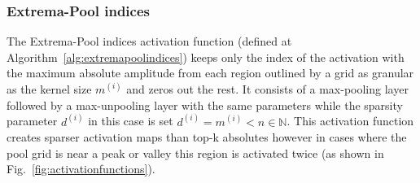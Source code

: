 \documentclass[journal]{IEEEtran}
\begin{document}
\subsubsection{Extrema-Pool indices}\label{sec:extremapoolindices}
The Extrema-Pool indices activation function (defined at
Algorithm~\ref{alg:extremapoolindices}) keeps only the index of the
activation with the maximum absolute amplitude from each region
outlined by a grid as granular as the kernel size $m^{(i)}$ and zeros
out the rest.
It consists of a max-pooling layer followed by a max-unpooling layer
with the same parameters while the sparsity parameter $d^{(i)}$ in
this case is set $d^{(i)} = m^{(i)} < n \in \mathbb{N}$.
This activation function creates sparser activation maps than top-k
absolutes however in cases where the pool grid is near a peak or
valley this region is activated twice (as shown in
Fig.~\ref{fig:activationfunctions}).
\begin{algorithm}[H]
  \caption{Extrema-Pool indices}\label{alg:extremapoolindices}
  \begin{algorithmic}[1]
    \renewcommand{\algorithmicrequire}{\textbf{Input:}}
    \renewcommand{\algorithmicensure}{\textbf{Output:}}
    \ENSURE{$\alpha$}
    \RETURN{$\alpha$}
  \end{algorithmic}
\end{algorithm}
\end{document}
